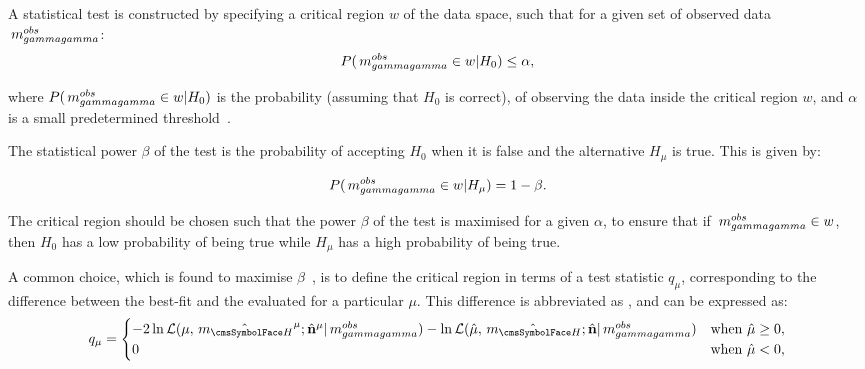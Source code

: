 A statistical test is constructed by specifying a critical region $w$ of the data space, such that for a given set of observed data $\,m_{gammagamma}^{obs}$:
\begin{equation}
P(\,m_{gammagamma}^{obs} \in w | H_{0} ) \leq \alpha,
\end{equation}

where  $P(\,m_{gammagamma}^{obs} \in w | H_{0} ) $ is the probability (assuming that $H_{0}$ is correct), of observing the data inside the critical region $w$, and $\alpha$ is a small predetermined threshold~\cite{Cowan}. 

The statistical power $\beta$ of the test is the probability of accepting $H_{0}$ when it is false and the alternative $H_{\mu} $ is true. This is given by:

\begin{equation}
P(\,m_{gammagamma}^{obs} \in  w | H_{\mu} ) = 1 - \beta.
\end{equation}

The critical region should be chosen such that the power $\beta$ of the test is maximised for a given $\alpha$, to ensure that if $\,m_{gammagamma}^{obs} \in w$, then $H_{0}$ has a low probability of being true while $H_{\mu}$ has a high probability of being true.  

A common choice, which is found to maximise $\beta$~\cite{Cowan}, is to define the critical region in terms of a test statistic $q_{\mu}$, corresponding to the difference between the best-fit \NLL and the \NLL evaluated for a particular $\mu$. This difference is abbreviated as \DNLL, and can be expressed as:
\begin{equation}
q_{\mu} = \begin{cases} 
  -2 \ln \mathcal{L}(\mu,\hat{\mH}^{\mu} ; \hat{\mathbf{n}}^{\mu}| \mgg^{obs})- \ln\mathcal{L}(\hat{\mu},\hat{\mH} ;\hat{\mathbf{n}}| \mgg^{obs} ) & \text{when } \hat{\mu} \geq 0, \\
  0 & \text{when } \hat{\mu} < 0, 
  \end{cases}
\end{equation}

